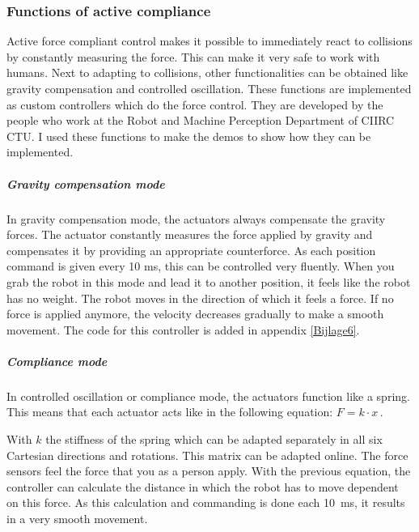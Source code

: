 \documentclass[11pt,a4paper]{report}
\begin{document}
\subsubsection{Functions of active compliance}\label{ComplianceFunctions}
Active force compliant control makes it possible to immediately react to collisions by constantly measuring the force. This can make it very safe to work with humans. Next to adapting to collisions, other functionalities can be obtained like gravity compensation and controlled oscillation. These functions are implemented as custom controllers which do the force control. They are developed by the people who work at the Robot and Machine Perception Department of CIIRC CTU.
I used these functions to make the demos to show how they can be implemented.
\subparagraph{Gravity compensation mode}
In gravity compensation mode, the actuators always compensate the gravity forces. The actuator constantly measures the force applied by gravity and compensates it by providing an appropriate counterforce. As each position command is given every 10 ms, this can be controlled very fluently. When you grab the robot in this mode and lead it to another position, it feels like the robot has no weight. The robot moves in the direction of which it feels a force. If no force is applied anymore, the velocity decreases gradually to make a smooth movement. The code for this controller is added in appendix \ref{Bijlage6}. \cite{GravityController}
\subparagraph{Compliance mode}
In controlled oscillation or compliance mode, the actuators function like a spring. This means that each actuator acts like in the following equation:
\begin{math}
F = k \cdot x \,.
\end{math}

With $k$ the stiffness of the spring which can be adapted separately in all six Cartesian directions and rotations. This matrix can be adapted online. The force sensors feel the force that you as a person apply. With the previous equation, the controller can calculate the distance in which the robot has to move dependent on this force. As this calculation and commanding is done each 10~ms, it results in a very smooth movement.
\end{document}
